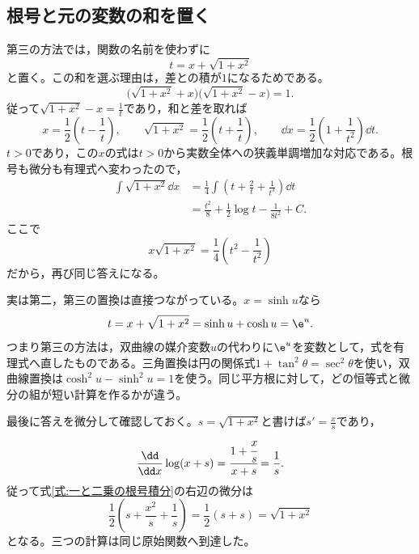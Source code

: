 \subsection{根号と元の変数の和を置く}

第三の方法では，関数の名前を使わずに
\[
t=x+\sqrt{1+x^2}
\]
と置く。この和を選ぶ理由は，差との積が$1$になるためである。
\[
\bigl(\sqrt{1+x^2}+x\bigr)
\bigl(\sqrt{1+x^2}-x\bigr)=1.
\]
従って$\sqrt{1+x^2}-x=\frac1t$であり，和と差を取れば
\[
x=\frac12\left(t-\frac1t\right),\qquad
\sqrt{1+x^2}=\frac12\left(t+\frac1t\right),\qquad
\dd x=\frac12\left(1+\frac1{t^2}\right)\dd t.
\]
$t>0$であり，この$x$の式は$t>0$から実数全体への狭義単調増加な対応である。根号も微分も有理式へ変わったので，
\[
\begin{aligned}
\int\sqrt{1+x^2}\dd x
&=\frac14\int\left(t+\frac2t+\frac1{t^3}\right)\dd t\\
&=\frac{t^2}{8}+\frac12\log t-\frac1{8t^2}+C.
\end{aligned}
\]
ここで
\[
x\sqrt{1+x^2}=\frac14\left(t^2-\frac1{t^2}\right)
\]
だから，再び同じ答えになる。

実は第二，第三の置換は直接つながっている。$x=\sinh u$なら
\[
t=x+\sqrt{1+x^2}=\sinh u+\cosh u=\e^u.
\]
つまり第三の方法は，双曲線の媒介変数$u$の代わりに$\e^u$を変数として，式を有理式へ直したものである。三角置換は円の関係式$1+\tan^2\theta=\sec^2\theta$を使い，双曲線置換は$\cosh^2u-\sinh^2u=1$を使う。同じ平方根に対して，どの恒等式と微分の組が短い計算を作るかが違う。

最後に答えを微分して確認しておく。$s=\sqrt{1+x^2}$と書けば$s'=\frac xs$であり，
\[
\frac{\dd}{\dd x}\log(x+s)
=\cfrac{1+\cfrac xs}{x+s}=\frac1s.
\]
従って式\eqref{式:一と二乗の根号積分}の右辺の微分は
\[
\frac12\left(s+\frac{x^2}{s}+\frac1s\right)
=\frac12(s+s)=\sqrt{1+x^2}
\]
となる。三つの計算は同じ原始関数へ到達した。

